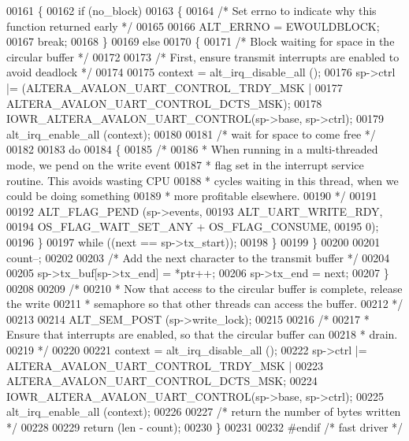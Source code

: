 \begin{DoxyCode}
00161     \{
00162       \textcolor{keywordflow}{if} (no\_block)
00163       \{
00164         \textcolor{comment}{/* Set errno to indicate why this function returned early */}
00165  
00166         ALT_ERRNO = EWOULDBLOCK;
00167         \textcolor{keywordflow}{break};
00168       \}
00169       \textcolor{keywordflow}{else}
00170       \{
00171         \textcolor{comment}{/* Block waiting for space in the circular buffer */}
00172 
00173         \textcolor{comment}{/* First, ensure transmit interrupts are enabled to avoid deadlock */}
00174 
00175         context = alt_irq_disable_all ();
00176         sp->ctrl |= (ALTERA_AVALON_UART_CONTROL_TRDY_MSK |
00177                         ALTERA_AVALON_UART_CONTROL_DCTS_MSK);
00178         IOWR_ALTERA_AVALON_UART_CONTROL(sp->base, sp->ctrl);
00179         alt_irq_enable_all (context);
00180 
00181         \textcolor{comment}{/* wait for space to come free */}
00182 
00183         \textcolor{keywordflow}{do}
00184         \{
00185           \textcolor{comment}{/*}
00186 \textcolor{comment}{           * When running in a multi-threaded mode, we pend on the write event }
00187 \textcolor{comment}{           * flag set in the interrupt service routine. This avoids wasting CPU}
00188 \textcolor{comment}{           * cycles waiting in this thread, when we could be doing something}
00189 \textcolor{comment}{           * more profitable elsewhere.}
00190 \textcolor{comment}{           */}
00191 
00192           ALT_FLAG_PEND (sp->events, 
00193                          ALT_UART_WRITE_RDY,
00194                          OS\_FLAG\_WAIT\_SET\_ANY + OS\_FLAG\_CONSUME,
00195                          0);
00196         \}
00197         \textcolor{keywordflow}{while} ((next == sp->tx_start));
00198       \}
00199     \}
00200 
00201     count--;
00202 
00203     \textcolor{comment}{/* Add the next character to the transmit buffer */}
00204 
00205     sp->tx_buf[sp->tx_end] = *ptr++;
00206     sp->tx_end = next;
00207   \}
00208 
00209   \textcolor{comment}{/*}
00210 \textcolor{comment}{   * Now that access to the circular buffer is complete, release the write}
00211 \textcolor{comment}{   * semaphore so that other threads can access the buffer.}
00212 \textcolor{comment}{   */}
00213 
00214   ALT_SEM_POST (sp->write\_lock);
00215 
00216   \textcolor{comment}{/* }
00217 \textcolor{comment}{   * Ensure that interrupts are enabled, so that the circular buffer can }
00218 \textcolor{comment}{   * drain.}
00219 \textcolor{comment}{   */}
00220 
00221   context = alt_irq_disable_all ();
00222   sp->ctrl |= ALTERA_AVALON_UART_CONTROL_TRDY_MSK |
00223                  ALTERA_AVALON_UART_CONTROL_DCTS_MSK;
00224   IOWR_ALTERA_AVALON_UART_CONTROL(sp->base, sp->ctrl);
00225   alt_irq_enable_all (context);
00226 
00227   \textcolor{comment}{/* return the number of bytes written */}
00228 
00229   \textcolor{keywordflow}{return} (len - count);
00230 \}
00231 
00232 \textcolor{preprocessor}{#endif }\textcolor{comment}{/* fast driver */}\textcolor{preprocessor}{}
\end{DoxyCode}
